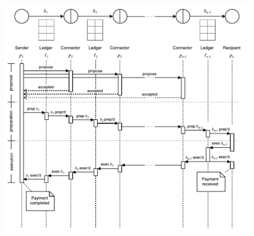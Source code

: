 \documentclass[letterpaper,twocolumn,10pt]{article}
\begin{document}
\begin{minipage}{\textwidth}
    \centering
    \includegraphics[width=\textwidth]{figures/universal-sequence.pdf}
\end{minipage}
\end{document}
